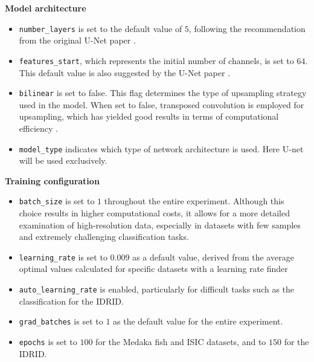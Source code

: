 \textbf{Model architecture}
\begin{itemize}
  \item \texttt{number\_layers} is set to the default value of $5$, following the recommendation from the original U-Net paper \cite{DBLP:journals/corr/RonnebergerFB15}.
  \item \texttt{features\_start}, which represents the initial number of channels, is set to $64$. This default value is also suggested by the U-Net paper \cite{DBLP:journals/corr/RonnebergerFB15}.
  \item \texttt{bilinear} is set to false. This flag determines the type of upsampling strategy used in the model. When set to false, transposed convolution is employed for upsampling, which has yielded good results in terms of computational efficiency \cite{8970918}.
  \item \texttt{model\_type} indicates which type of network architecture is used. Here U-net will be used exclusively.
\end{itemize}

\textbf{Training configuration}
\begin{itemize}
  \item \texttt{batch\_size} is set to $1$ throughout the entire experiment. Although this choice results in higher computational costs, it allows for a more detailed examination of high-resolution data, especially in datasets with few samples and extremely challenging classification tasks.
  \item \texttt{learning\_rate} is set to $0.009$ as a default value, derived from the average optimal values calculated for specific datasets with a learning rate finder
  \item \texttt{auto\_learning\_rate} is enabled, particularly for difficult tasks such as the classification for the \acf{IDRID}.
  \item \texttt{grad\_batches} is set to $1$ as the default value for the entire experiment.
  \item \texttt{epochs} is set to $100$ for the Medaka fish \cite{10.1371/journal.pone.0263656} and \acf{ISIC}\cite{DBLP:journals/corr/abs-1710-05006} datasets, and to $150$ for the \ac{IDRID}.
\end{itemize}


